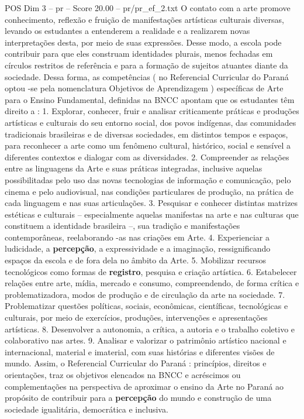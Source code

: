\begin{textsample}{POS Dim 3 – pr – Score 20.00 – pr/pr\_ef\_2.txt}
O contato com a arte promove conhecimento, reflexão e fruição de manifestações artísticas culturais diversas, levando os estudantes a entenderem a realidade e a realizarem novas interpretações desta, por meio de suas expressões.
Desse modo, a escola pode contribuir para que eles construam identidades plurais, menos fechadas em círculos restritos de referência e para a formação de sujeitos atuantes diante da sociedade.
Dessa forma, as competências ( no Referencial Curricular do Paraná optou -se pela nomenclatura Objetivos de Aprendizagem ) específicas de Arte para o Ensino Fundamental, definidas na BNCC apontam que os estudantes têm direito a : 1.
Explorar, conhecer, fruir e analisar criticamente práticas e produções artísticas e culturais do seu entorno social, dos povos indígenas, das comunidades tradicionais brasileiras e de diversas sociedades, em distintos tempos e espaços, para reconhecer a arte como um fenômeno cultural, histórico, social e sensível a diferentes contextos e dialogar com as diversidades. 2.
Compreender as relações entre as linguagens da Arte e suas práticas integradas, inclusive aquelas possibilitadas pelo uso das novas tecnologias de informação e comunicação, pelo cinema e pelo audiovisual, nas condições particulares de produção, na prática de cada linguagem e nas suas articulações. 3.
Pesquisar e conhecer distintas matrizes estéticas e culturais – especialmente aquelas manifestas na arte e nas culturas que constituem a identidade brasileira –, sua tradição e manifestações contemporâneas, reelaborando -as nas criações em Arte. 4.
Experienciar a ludicidade, a \textbf{percepção}, a expressividade e a imaginação, ressignificando espaços da escola e de fora dela no âmbito da Arte. 5.
Mobilizar recursos tecnológicos como formas de \textbf{registro}, pesquisa e criação artística. 6.
Estabelecer relações entre arte, mídia, mercado e consumo, compreendendo, de forma crítica e problematizadora, modos de produção e de circulação da arte na sociedade. 7.
Problematizar questões políticas, sociais, econômicas, científicas, tecnológicas e culturais, por meio de exercícios, produções, intervenções e apresentações artísticas. 8.
Desenvolver a autonomia, a crítica, a autoria e o trabalho coletivo e colaborativo nas artes. 9.
Analisar e valorizar o patrimônio artístico nacional e internacional, material e imaterial, com suas histórias e diferentes visões de mundo.
Assim, o Referencial Curricular do Paraná : princípios, direitos e orientações, traz os objetivos elencados na BNCC e acréscimos ou complementações na perspectiva de aproximar o ensino da Arte no Paraná ao propósito de contribuir para a \textbf{percepção} do mundo e construção de uma sociedade igualitária, democrática e inclusiva.

\end{textsample}
